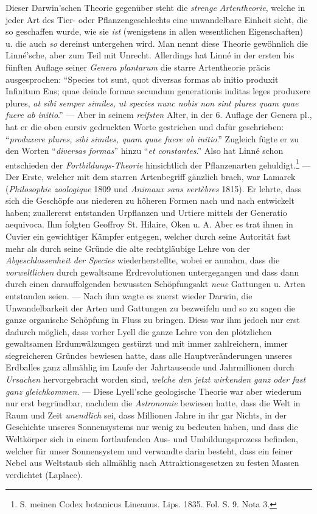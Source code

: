 \documentclass[a4paper, 11pt, oneside, english]{article}
\begin{document}
Dieser Darwin'schen Theorie gegenüber steht die \emph{strenge Artentheorie}, welche in jeder Art des Tier- oder Pflanzengeschlechts eine unwandelbare Einheit sieht, die so geschaffen wurde, wie sie \emph{ist} (wenigstens in allen wesentlichen Eigenschaften) u. die auch \emph{so} dereinst untergehen wird. Man nennt diese Theorie gewöhnlich die Linné'sche, aber zum Teil mit Unrecht. Allerdings hat Linné in der ersten bis fünften Auflage seiner \emph{Genera plantarum} die starre Artentheorie präcis ausgesprochen: "`Species tot sunt, quot diversas formas ab initio produxit Infinitum Ens; quae deinde formae secundum generationis inditas leges produxere plures, \emph{at sibi semper similes, ut species nunc nobis non sint plures quam quae fuere ab initio}."' --- Aber in seinem \emph{reifsten} Alter, in der 6. Auflage der Genera pl., hat er die oben cursiv gedruckten Worte gestrichen und dafür geschrieben: "`\emph{produxere plures, sibi similes, quam quae fuere ab initio}."' Zugleich fügte er zu den Worten "`\emph{diversas formas}"' hinzu "`\emph{et constantes}."' Also hat Linné schon entschieden der \emph{Fortbildungs-Theorie} hinsichtlich der Pflanzenarten gehuldigt.\footnote{S. meinen Codex botanicus Lineanus. Lips. 1835. Fol. S. 9. Nota 3.} --- Der Erste, welcher mit dem starren Artenbegriff gänzlich brach, war Lamarck (\emph{Philosophie zoologique} 1809 und \emph{Animaux sans vertèbres} 1815). Er lehrte, dass sich die Geschöpfe aus niederen zu höheren Formen nach und nach entwickelt haben; zuallererst entstanden Urpflanzen und Urtiere mittels der Generatio aequivoca. Ihm folgten Geoffroy St. Hilaire, Oken u. A. Aber es trat ihnen in Cuvier ein gewichtiger Kämpfer entgegen, welcher durch seine Autorität fast mehr als durch seine Gründe die alte rechtgläubige Lehre von der \emph{Abgeschlossenheit der Species} wiederherstellte, wobei er annahm, dass die \emph{vorweltlichen} durch gewaltsame Erdrevolutionen untergegangen und dass dann durch einen darauffolgenden bewussten Schöpfungsakt \emph{neue} Gattungen u. Arten entstanden seien. --- Nach ihm wagte es zuerst wieder Darwin, die Unwandelbarkeit der Arten und Gattungen zu bezweifeln und so zu sagen die ganze organische Schöpfung in Fluss zu bringen. Diess war ihm jedoch nur erst dadurch möglich, dass vorher Lyell die ganze Lehre von den plötzlichen gewaltsamen Erdumwälzungen gestürzt und mit immer zahlreichern, immer siegreicheren Gründes bewiesen hatte, dass alle Hauptveränderungen unseres Erdballes ganz allmählig im Laufe der Jahrtausende und Jahrmillionen durch \emph{Ursachen} hervorgebracht worden sind, \emph{welche den jetzt wirkenden ganz oder fast ganz gleichkommen}. --- Diese Lyell'sche geologische Theorie war aber wiederum nur erst begründbar, nachdem die \emph{Astronomie} bewiesen hatte, dass die Welt in Raum und Zeit \emph{unendlich} sei, dass Millionen Jahre in ihr gar Nichts, in der Geschichte unseres Sonnensystems nur wenig zu bedeuten haben, und dass die Weltkörper sich in einem fortlaufenden Aus- und Umbildungsprozess befinden, welcher für unser Sonnensystem und verwandte darin besteht, dass ein feiner Nebel aus Weltstaub sich allmählig nach Attraktionsgesetzen zu festen Massen verdichtet (Laplace).
\end{document}
